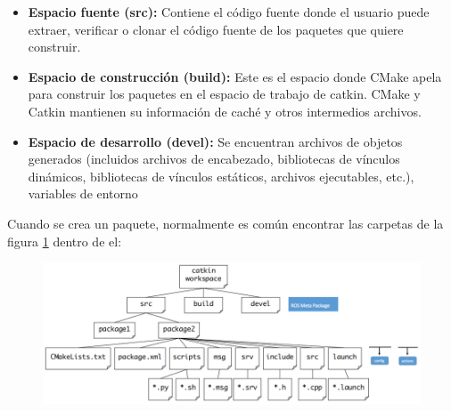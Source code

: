                \newpage

            \begin{itemize}
                \item {\textbf{Espacio fuente (src):} Contiene el código fuente donde el usuario puede extraer, verificar o clonar el código fuente de los paquetes que quiere construir.}
                \item {\textbf{Espacio de construcción (build):} Este es el espacio donde CMake apela para construir los paquetes en el espacio de trabajo de catkin. CMake y Catkin mantienen su información de caché y otros intermedios archivos.}
                \item {\textbf{Espacio de desarrollo (devel):} Se encuentran archivos de objetos generados (incluidos archivos de encabezado, bibliotecas de vínculos dinámicos, bibliotecas de vínculos estáticos, archivos ejecutables, etc.), variables de entorno}
            \end{itemize}

            Cuando se crea un paquete, normalmente es común encontrar las carpetas de la figura \ref{f:Cap3_conceptos_4} dentro de el:
            
            \begin{figure}[htb]
                \centering
                \includegraphics[width=1.0\linewidth]{Main/Chapter3/Images3/n_s_a_4.png}
                \caption{}
                \label{f:Cap3_conceptos_4}
            \end{figure} 

